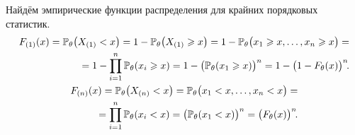 \begin{exmp}
    Найдём эмпирические функции распределения для крайних порядковых статистик.
    \begin{gather*}
        \begin{aligned}
            F_{(1)}(x)=\operatorname{\operatorname{\mathbb{P}}_{\theta}} \bigl(X_{(1)} < x \bigr) 
        = 1 - \operatorname{\operatorname{\mathbb{P}}_{\theta}} \bigl(X_{(1)} \geqslant x \bigr) 
        = 1 - \operatorname{\operatorname{\mathbb{P}}_{\theta}} \bigl(x_{1} \geqslant x, \ldots, x_{n} \geqslant x\bigr) = \\
        = 1 - \prod_{i=1}^{n} \operatorname{\operatorname{\mathbb{P}}_{\theta}} (x_{i} \geqslant x) 
        = 1 - \bigl(\operatorname{\operatorname{\mathbb{P}}_{\theta}} ({x}_{1} \geqslant x)\bigr)^{n} 
        = 1 - \bigl(1 - F_{\theta}(x)\bigr)^{n}\!.
        \end{aligned} \\
        \begin{aligned}
            F_{(n)}(x) 
            = \operatorname{\operatorname{\mathbb{P}}_{\theta}} \bigl(X_{(n)} < x\bigr) 
            = \operatorname{\operatorname{\mathbb{P}}_{\theta}} \bigl(x_{1} < x, \ldots, x_{n} < x\bigr) = \\
            = \prod_{i=1}^{n} \operatorname{\operatorname{\mathbb{P}}_{\theta}} (x_{i} < x) 
            = \bigl(\operatorname{\operatorname{\mathbb{P}}_{\theta}} ({x}_{1} < x)\bigr)^{n} 
            = \bigl( F_{\theta}(x) \bigr)^n \!.
        \end{aligned}
    \end{gather*}
\end{exmp}

